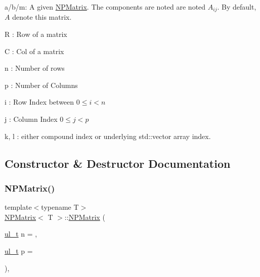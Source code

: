 \begin{DoxyItemize}
\item {\ttfamily a}/{\ttfamily b}/{\ttfamily m}\+: A given {\ttfamily \mbox{\hyperlink{class_n_p_matrix}{N\+P\+Matrix}}}. The components are noted are noted $ A_{ij} $. By default, $ A $ denote {\ttfamily this} matrix.
\item {\ttfamily R} \+: Row of a matrix
\item {\ttfamily C} \+: Col of a matrix
\item {\ttfamily n} \+: Number of rows
\item {\ttfamily p} \+: Number of Columns
\item {\ttfamily i} \+: Row Index between $ 0 \leq i < n $
\item {\ttfamily j} \+: Column Index $ 0 \leq j < p $
\item {\ttfamily k}, {\ttfamily l} \+: either compound index or underlying {\ttfamily std\+::vector} array index. 
\end{DoxyItemize}

\subsection{Constructor \& Destructor Documentation}
\mbox{\label{class_n_p_matrix_a911b2434435553b06276977f3a86bb87}} 
\subsubsection{\texorpdfstring{NPMatrix()}{NPMatrix()}\hspace{0.1cm}{\footnotesize\ttfamily [1/7]}}
{\footnotesize\ttfamily template$<$typename T$>$ \\
\mbox{\hyperlink{class_n_p_matrix}{N\+P\+Matrix}}$<$ T $>$\+::\mbox{\hyperlink{class_n_p_matrix}{N\+P\+Matrix}} (\begin{DoxyParamCaption}\item[{\mbox{\hyperlink{typedef_8h_a1b140a2034db3f5dfe18a987745df43a}{ul\+\_\+t}}}]{n = {},  }\item[{\mbox{\hyperlink{typedef_8h_a1b140a2034db3f5dfe18a987745df43a}{ul\+\_\+t}}}]{p = {} }\end{DoxyParamCaption})\hspace{0.3cm}{\ttfamily [inline]}, {\ttfamily [explicit]}}




